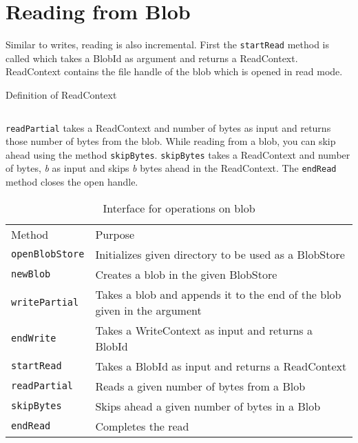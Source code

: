 \section{Reading from Blob}
Similar to writes, reading is also incremental. First the \texttt{startRead} method is called which takes a BlobId as argument and returns a ReadContext. ReadContext contains the file handle of the blob which is opened in read mode.

\begin{program}
  \caption{Definition of ReadContext}
  \label{fig:defreadcontext}
  \inputminted{haskell}{hs/readcontext.hs}
\end{program}

\texttt{readPartial} takes a ReadContext and number of bytes as input and returns those number of bytes from the blob.
While reading from a blob, you can skip ahead using the method \texttt{skipBytes}. \texttt{skipBytes} takes a ReadContext and number of bytes, \textit{b} as input and skips \textit{b} bytes ahead in the ReadContext.
The \texttt{endRead} method closes the open handle.

\begin{table}[hbt]
\caption{Interface for operations on blob}
\label{tab:interface-blob}
\begin{center}
  \begin{tabularx}{0.91\textwidth}{lX}
    \hline\noalign{\smallskip}
    Method & Purpose \\
    \noalign{\smallskip}
    \hline
    \noalign{\smallskip}
    \texttt{openBlobStore} & Initializes given directory to be used as a BlobStore \\
    \texttt{newBlob} & Creates a blob in the given BlobStore\\
    \texttt{writePartial} & Takes a blob and appends it to the end of the blob given in the argument\\
    \texttt{endWrite} & Takes a WriteContext as input and returns a BlobId \\
    \texttt{startRead} & Takes a BlobId as input and returns a ReadContext \\
    \texttt{readPartial} & Reads a given number of bytes from a Blob \\
    \texttt{skipBytes} & Skips ahead a given number of bytes in a Blob \\
    \texttt{endRead} & Completes the read \\
    \hline
  \end{tabularx}
\end{center}
\end{table}


